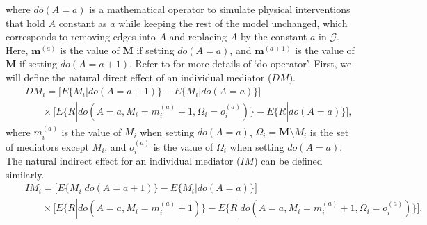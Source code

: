 where $do(A=a)$ is a mathematical operator to simulate physical interventions that hold $A$ constant as $a$ while keeping the rest of the model unchanged, which corresponds to removing edges into $A$ and replacing $A$ by the constant $a$ in $\mathcal{G}$. Here,  $\mathbf{m}^{(a)}$ is the value of $\mathbf{M}$ if setting $do(A=a)$, and $\mathbf{m}^{(a+1)}$ is the value of $\mathbf{M}$ if setting $do(A=a+1)$. Refer to \citet{pearl2009causal} for more details of `do-operator'. 
First, we will define the natural direct effect of an individual mediator ($DM$). 
\begin{eqnarray*}
    &&DM_i=  \Big[E\{M_i|do(A=a+1)\}-E\{M_i|do(A=a)\}\Big] \\
&&~~~~~~~~\times \Big[E\{R|do(A=a, M_i=m^{(a)}_i+1, \Omega_i=o^{(a)}_i)\}- E\{R|do(A=a)\}\Big], 
\end{eqnarray*}  
where $m^{(a)}_i$ is the value of $ M_i$ when setting $do(A=a)$, $\Omega_i=\mathbf{M}\setminus M_i$ is the set of mediators except $M_i$, and $o^{(a)}_i$ is the value of $\Omega_i$ when setting $do(A=a)$. 
The natural indirect effect for an individual mediator ($IM$) can be defined similarly.
\begin{eqnarray*}
    &&\label{def_IM} 
IM_i= \Big[E\{M_i|do(A=a+1)\}-E\{M_i|do(A=a)\}\Big] \\
&&~~~~~~~~ \times \Big[E\{R|do(A=a, M_i=m^{(a)}_i+1)\}-E\{R|do(A=a, M_i=m^{(a)}_i+1, \Omega_i=o^{(a)}_i)\}\Big]. 
\end{eqnarray*}  





